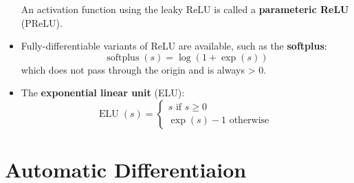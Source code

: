 \documentclass{article}
\newcommand{\tbf}[1]{\textbf{#1}}
\begin{document}
\begin{itemize}
            An activation function using the leaky ReLU is called a \tbf{parameteric ReLU} (PReLU). 
            \item Fully-differentiable variants of ReLU are available, such as the \tbf{softplus}:
            \[\operatorname{softplus}(s) = \operatorname{log}(1+\operatorname{exp}(s))\]
            which does not pass through the origin and is always > 0.
            \item The \tbf{exponential linear unit} (ELU):
            \[\operatorname{ELU}(s) = 
            \begin{cases}
                s \text{ if } s \geq 0 \\
                \operatorname{exp}(s) - 1 \text{ otherwise }
            \end{cases}\]
        \end{itemize}
        \section{Automatic Differentiaion}
\end{document}
